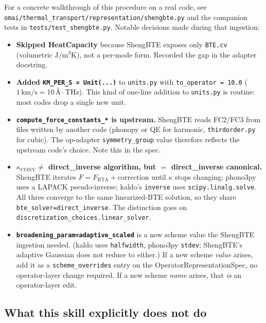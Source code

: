 \documentclass[11pt,a4paper]{article}
\begin{document}
For a concrete walkthrough of this procedure on a real code, see
\texttt{omai/thermal\_transport/representation/shengbte.py} and the companion tests
in \texttt{tests/test\_shengbte.py}. Notable decisions made during that ingestion:
\begin{itemize}[leftmargin=2em]
  \item \textbf{Skipped HeatCapacity} because ShengBTE exposes only \texttt{BTE.cv}
        (volumetric $\mathrm{J/m^3K}$), not a per-mode form. Recorded the gap in the
        adapter docstring.
  \item \textbf{Added \texttt{KM\_PER\_S = Unit(...)}} to \texttt{units.py} with
        \texttt{to\_operator = 10.0} ($1\,\mathrm{km/s} =
        10\,\text{\AA}\cdot\mathrm{THz}$). This kind of one-line addition to \texttt{units.py} is routine:
        most codes drop a single new unit.
  \item \textbf{\texttt{compute\_force\_constants\_*} is upstream.} ShengBTE reads
        FC2/FC3 from files written by another code (phonopy or QE for harmonic,
        \texttt{thirdorder.py} for cubic). The op-adapter \texttt{symmetry\_group}
        value therefore reflects the upstream code's choice. Note this in the spec.
  \item \textbf{$\kappa_{\mathrm{CONV}} \neq$ direct\_inverse algorithm, but $=$
        direct\_inverse canonical.} ShengBTE iterates $F = F_{\mathrm{RTA}} +
        \text{correction}$ until $\kappa$ stops changing; phono3py uses a LAPACK
        pseudo-inverse; kaldo's \texttt{inverse} uses \texttt{scipy.linalg.solve}.
        All three converge to the same linearized-BTE solution, so they share
        \texttt{bte\_solver=direct\_inverse}. The distinction goes on
        \texttt{discretization\_choices.}\allowbreak\texttt{linear\_solver}.
  \item \textbf{\texttt{broadening\_param=adaptive\_scaled}} is a new scheme value
        the ShengBTE ingestion needed. (kaldo uses \texttt{halfwidth}, phono3py
        \texttt{stdev}; ShengBTE's adaptive Gaussian does not reduce to either.) If
        a new scheme \emph{value} arises, add it as a \texttt{scheme\_overrides}
        entry on the OperatorRepresentationSpec, no operator-layer change required.
        If a new scheme \emph{name} arises, that \emph{is} an operator-layer edit.
\end{itemize}

\subsection{What this skill explicitly does not do}
\end{document}

